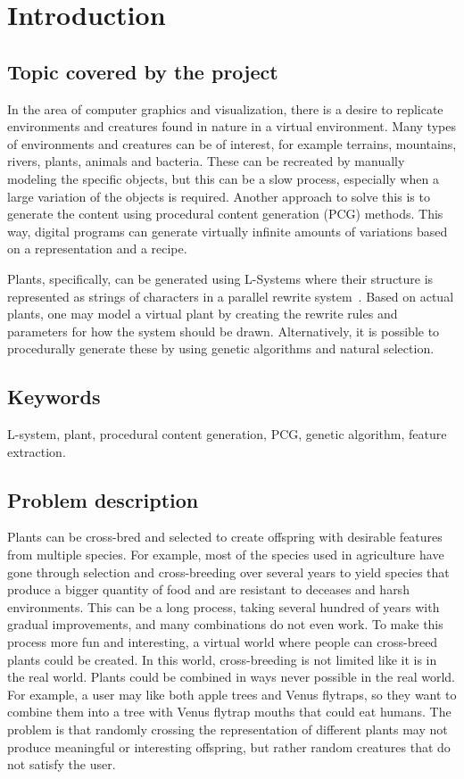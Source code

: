 \chapter{Introduction}
\label{chap:introduction}

\section{Topic covered by the project}
In the area of computer graphics and visualization, there is a desire to replicate environments and creatures found in nature in a virtual environment.
Many types of environments and creatures can be of interest, for example terrains, mountains, rivers, plants, animals and bacteria.
These can be recreated by manually modeling the specific objects, but this can be a slow process, especially when a large variation of the objects is required.
Another approach to solve this is to generate the content using procedural content generation (PCG) methods.
This way, digital programs can generate virtually infinite amounts of variations based on a representation and a recipe.

Plants, specifically, can be generated using L-Systems where their structure is represented as strings of characters in a parallel rewrite system~\cite{2012Prusinkiewicz}.
Based on actual plants, one may model a virtual plant by creating the rewrite rules and parameters for how the system should be drawn.
Alternatively, it is possible to procedurally generate these by using genetic algorithms and natural selection.

\section{Keywords}
L-system, plant, procedural content generation, PCG, genetic algorithm, feature extraction.

\section{Problem description}
Plants can be cross-bred and selected to create offspring with desirable features from multiple species.
For example, most of the species used in agriculture have gone through selection and cross-breeding over several years to yield species that produce a bigger quantity of food and are resistant to deceases and harsh environments.
This can be a long process, taking several hundred of years with gradual improvements, and many combinations do not even work.
To make this process more fun and interesting, a virtual world where people can cross-breed plants could be created.
In this world, cross-breeding is not limited like it is in the real world.
Plants could be combined in ways never possible in the real world.
For example, a user may like both apple trees and Venus flytraps, so they want to combine them into a tree with Venus flytrap mouths that could eat humans.
The problem is that randomly crossing the representation of different plants may not produce meaningful or interesting offspring, but rather random creatures that do not satisfy the user.


